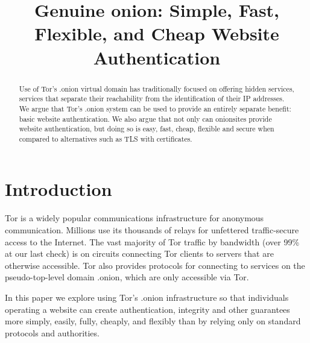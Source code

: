 \documentclass[10pt, conference, compsocconf]{styles/IEEEtran}
\title{Genuine onion: Simple, Fast, Flexible, and Cheap Website Authentication}
\author{
\IEEEauthorblockN{Paul Syverson}
\IEEEauthorblockA{U.S. Naval Research Laboratory\\
paul.syverson@nrl.navy.mil}
\and
\IEEEauthorblockN{Griffin Boyce}
\IEEEauthorblockA{Open Internet Tools Project\\
griffin@cryptolab.net}
}
\begin{document}
\maketitle

\begin{abstract}
  Use of Tor's .onion virtual domain has traditionally focused on
  offering hidden services, services that separate their reachability
  from the identification of their IP addresses. We argue that Tor's
  .onion system can be used to provide an entirely separate benefit:
  basic website authentication. We also argue that not only can
  onionsites provide website authentication, but doing so is easy,
  fast, cheap, flexible and secure when compared to alternatives such
  as TLS with certificates.
\end{abstract}

% 
% 
% 
% 
% 
% 
% 
% 
% 
% 
% 

\section{Introduction}
Tor is a widely popular communications infrastructure for anonymous
communication. Millions use its thousands of relays for unfettered
traffic-secure access to the Internet. The vast majority of Tor
traffic by bandwidth (over 99\% at our last check) is on circuits
connecting Tor clients to servers that are otherwise accessible.  Tor
also provides protocols for connecting to services on the
pseudo-top-level domain .onion, which are only accessible via Tor.

In this paper we explore using Tor's .onion infrastructure so that
individuals operating a website can create authentication, integrity
and other guarantees more simply, easily, fully, cheaply, and flexibly
than by relying only on standard protocols and authorities.
\end{document}
